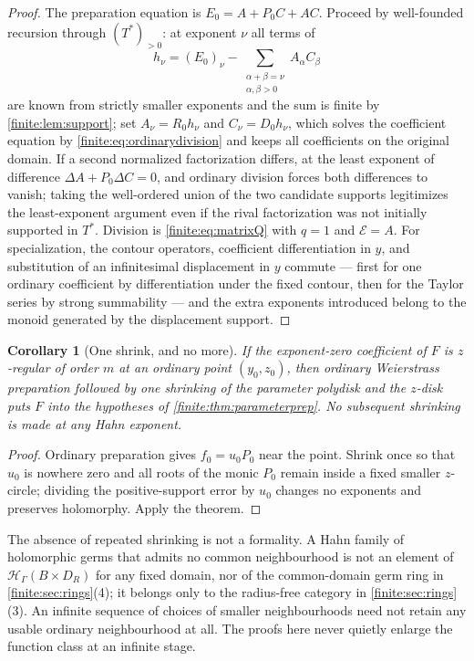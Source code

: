 \documentclass[11pt,letterpaper]{article}
\newtheorem{corollary}[theorem]{Corollary}
\theoremstyle{definition}
\theoremstyle{remark}
\newcommand{\HH}{\mathscr H}
\numberwithin{equation}{section}
\begin{document}
\begin{proof}
The preparation equation is $E_0=A+P_0C+AC$. Proceed by well-founded recursion through $(T^*)_{>0}$: at exponent $\nu$ all terms of
\[
 h_\nu=(E_0)_\nu-\sum_{\substack{\alpha+\beta=\nu\\ \alpha,\beta>0}}A_\alpha C_\beta
\]
are known from strictly smaller exponents and the sum is finite by \cref{finite:lem:support}; set $A_\nu=R_0h_\nu$ and $C_\nu=D_0h_\nu$, which solves the coefficient equation by \eqref{finite:eq:ordinarydivision} and keeps all coefficients on the original domain. If a second normalized factorization differs, at the least exponent of difference $\Delta A+P_0\Delta C=0$, and ordinary division forces both differences to vanish; taking the well-ordered union of the two candidate supports legitimizes the least-exponent argument even if the rival factorization was not initially supported in $T^*$. Division is \eqref{finite:eq:matrixQ} with $q=1$ and $\mathcal E=A$. For specialization, the contour operators, coefficient differentiation in $y$, and substitution of an infinitesimal displacement in $y$ commute --- first for one ordinary coefficient by differentiation under the fixed contour, then for the Taylor series by strong summability --- and the extra exponents introduced belong to the monoid generated by the displacement support.
\end{proof}

\begin{corollary}[One shrink, and no more]
\label{finite:cor:oneshrink}
If the exponent-zero coefficient of $F$ is $z$-regular of order $m$ at an ordinary point $(y_0,z_0)$, then ordinary Weierstrass preparation followed by \emph{one} shrinking of the parameter polydisk and the $z$-disk puts $F$ into the hypotheses of \cref{finite:thm:parameterprep}. No subsequent shrinking is made at any Hahn exponent.
\end{corollary}

\begin{proof}
Ordinary preparation gives $f_0=u_0P_0$ near the point. Shrink once so that $u_0$ is nowhere zero and all roots of the monic $P_0$ remain inside a fixed smaller $z$-circle; dividing the positive-support error by $u_0$ changes no exponents and preserves holomorphy. Apply the theorem.
\end{proof}

The absence of repeated shrinking is not a formality. A Hahn family of holomorphic germs that admits no common neighbourhood is not an element of $\HH_\Gamma(B\times D_R)$ for any fixed domain, nor of the common-domain germ ring in \cref{finite:sec:rings}(4); it belongs only to the radius-free category in \cref{finite:sec:rings}(3). An infinite sequence of choices of smaller neighbourhoods need not retain any usable ordinary neighbourhood at all. The proofs here never quietly enlarge the function class at an infinite stage.
\end{document}
